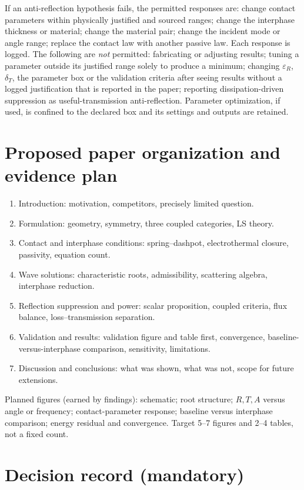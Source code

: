 \documentclass[11pt]{article}
\begin{document}
If an anti-reflection hypothesis fails, the permitted responses are: change
contact parameters within physically justified and sourced ranges; change the
interphase thickness or material; change the material pair; change the incident
mode or angle range; replace the contact law with another passive law. Each
response is logged. The following are \emph{not} permitted: fabricating or
adjusting results; tuning a parameter outside its justified range solely to
produce a minimum; changing $\varepsilon_R$, $\delta_T$, the parameter box or the
validation criteria after seeing results without a logged justification that is
reported in the paper; reporting dissipation-driven suppression as
useful-transmission anti-reflection. Parameter optimization, if used, is confined
to the declared box and its settings and outputs are retained.

\section{Proposed paper organization and evidence plan}

\begin{enumerate}
  \item Introduction: motivation, competitors, precisely limited question.
  \item Formulation: geometry, symmetry, three coupled categories, LS theory.
  \item Contact and interphase conditions: spring--dashpot, electrothermal
    closure, passivity, equation count.
  \item Wave solutions: characteristic roots, admissibility, scattering algebra,
    interphase reduction.
  \item Reflection suppression and power: scalar proposition, coupled criteria,
    flux balance, loss--transmission separation.
  \item Validation and results: validation figure and table first, convergence,
    baseline-versus-interphase comparison, sensitivity, limitations.
  \item Discussion and conclusions: what was shown, what was not, scope for
    future extensions.
\end{enumerate}
Planned figures (earned by findings): schematic; root structure; $R,T,A$ versus
angle or frequency; contact-parameter response; baseline versus interphase
comparison; energy residual and convergence. Target 5--7 figures and 2--4 tables,
not a fixed count.

\section{Decision record (mandatory)}
\end{document}
